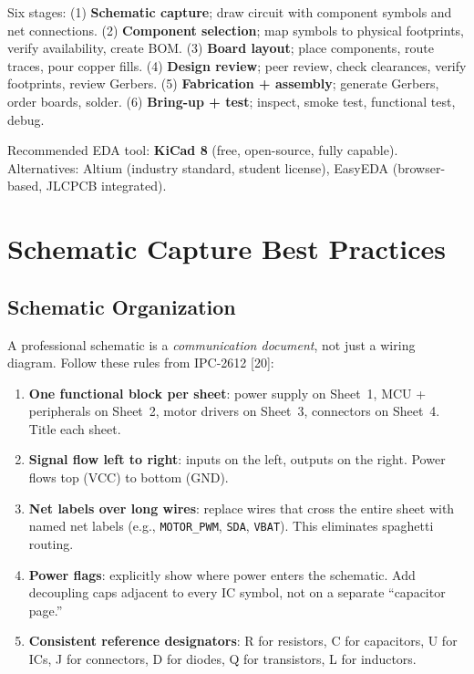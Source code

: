 \documentclass[11pt,letterpaper,twoside,openany]{book}
\begin{document}
Six stages: (1) \textbf{Schematic capture}; draw circuit with component symbols and net connections. (2) \textbf{Component selection}; map symbols to physical footprints, verify availability, create BOM. (3) \textbf{Board layout}; place components, route traces, pour copper fills. (4) \textbf{Design review}; peer review, check clearances, verify footprints, review Gerbers. (5) \textbf{Fabrication + assembly}; generate Gerbers, order boards, solder. (6) \textbf{Bring-up + test}; inspect, smoke test, functional test, debug.

Recommended EDA tool: \textbf{KiCad 8} (free, open-source, fully capable). Alternatives: Altium (industry standard, student license), EasyEDA (browser-based, JLCPCB integrated).


\section{Schematic Capture Best Practices}

\subsection{Schematic Organization}
A professional schematic is a \emph{communication document}, not just a wiring diagram. Follow these rules from IPC-2612 [20]:
\begin{enumerate}[nosep,leftmargin=1.5em]
\item \textbf{One functional block per sheet}: power supply on Sheet~1, MCU + peripherals on Sheet~2, motor drivers on Sheet~3, connectors on Sheet~4. Title each sheet.
\item \textbf{Signal flow left to right}: inputs on the left, outputs on the right. Power flows top (VCC) to bottom (GND).
\item \textbf{Net labels over long wires}: replace wires that cross the entire sheet with named net labels (e.g., \texttt{MOTOR\_PWM}, \texttt{SDA}, \texttt{VBAT}). This eliminates spaghetti routing.
\item \textbf{Power flags}: explicitly show where power enters the schematic. Add decoupling caps adjacent to every IC symbol, not on a separate ``capacitor page.''
\item \textbf{Consistent reference designators}: R for resistors, C for capacitors, U for ICs, J for connectors, D for diodes, Q for transistors, L for inductors.
\end{enumerate}
\end{document}
